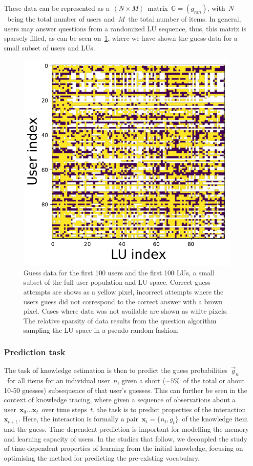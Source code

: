 These data can be represented as a~$(N \times M)$~matrix~$\mathbb{G} = (g_{nm})$, with~$N$~being the total number of users and~$M$~the total number of items. In general, users may answer questions from a randomized LU sequence, thus, this matrix is sparsely filled, as can be seen on~\cref{fig:user_data}, where we have shown the guess data for a small subset of users and LUs.

\begin{figure}[ht]
\centering
\includegraphics[width=0.5\linewidth]{figures/lingvist/user_data.pdf}
\caption[Word pair (LU) guess data for a subset of users and words]{Guess data for the first 100 users and the first 100 LUs, a small subset of the full user population and LU space. Correct guess attempts are shows as a yellow pixel, incorrect attempts where the users guess did not correspond to the correct answer with a brown pixel. Cases where data was not available are shown as white pixels. The relative sparsity of data results from the question algorithm sampling the LU space in a pseudo-random fashion.} 
\label{fig:user_data} 
\end{figure} 

\subsubsection{Prediction task}
The task of knowledge estimation is then to predict the guess probabilities~$\vec{g}_n$~for all items for an individual user~$n$, given a short ($\sim5\%$~of the total or about 10-50 guesses) subsequence of that user's guesses. This can further be seen in the context of knowledge tracing, where given a sequence of observations about a user~$\mathbf{x}_0 \dots \mathbf{x}_t$~over time steps~$t$, the task is to predict properties of the interaction~$\mathbf{x}_{t+1}$. Here, the interaction is formally a pair~$\mathbf{x}_t = \{n_t, g_t\}$~of the knowledge item and the guess. Time-dependent prediction is important for modelling the memory and learning capacity of users. In the studies that follow, we decoupled the study of time-dependent properties of learning from the initial knowledge, focusing on optimising the method for predicting the pre-existing vocabulary.

